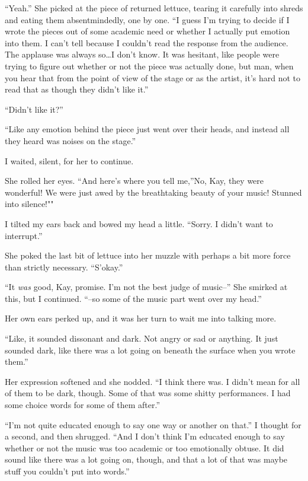 ``Yeah.'' She picked at the piece of returned lettuce, tearing it carefully into shreds and eating them absentmindedly, one by one. ``I guess I'm trying to decide if I wrote the pieces out of some academic need or whether I actually put emotion into them. I can't tell because I couldn't read the response from the audience. The applause was always so\ldots I don't know. It was hesitant, like people were trying to figure out whether or not the piece was actually done, but man, when you hear that from the point of view of the stage or as the artist, it's hard not to read that as though they didn't like it.''

``Didn't like it?''

``Like any emotion behind the piece just went over their heads, and instead all they heard was noises on the stage.''

I waited, silent, for her to continue.

She rolled her eyes. ``And here's where you tell me,''No, Kay, they were wonderful! We were just awed by the breathtaking beauty of your music! Stunned into silence!""

I tilted my ears back and bowed my head a little. ``Sorry. I didn't want to interrupt.''

She poked the last bit of lettuce into her muzzle with perhaps a bit more force than strictly necessary. ``S'okay.''

``It \emph{was} good, Kay, promise. I'm not the best judge of music--'' She smirked at this, but I continued. ``--so some of the music part went over my head.''

Her own ears perked up, and it was her turn to wait me into talking more.

``Like, it sounded dissonant and dark. Not angry or sad or anything. It just sounded dark, like there was a lot going on beneath the surface when you wrote them.''

Her expression softened and she nodded. ``I think there was. I didn't mean for all of them to be dark, though. Some of that was some shitty performances. I had some choice words for some of them after.''

``I'm not quite educated enough to say one way or another on that.'' I thought for a second, and then shrugged. ``And I don't think I'm educated enough to say whether or not the music was too academic or too emotionally obtuse. It did sound like there was a lot going on, though, and that a lot of that was maybe stuff you couldn't put into words.''

